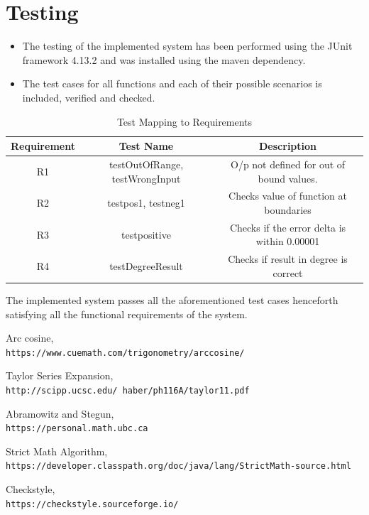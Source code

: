 \documentclass[a4paper,12pt]{article}
\begin{document}
\pagebreak

\section{Testing}
    \begin{itemize}
        \item {The testing of the implemented system has been performed using the JUnit framework 4.13.2 and was installed using the maven dependency.}
        \item{The test cases for all functions and each of their possible scenarios is included, verified and checked.}
    \end{itemize}

    \begin{table}[h]
    \centering
    \begin{tabular}{|c |c| c|} 
    \hline
     Requirement & Test Name & Description \\ [0.5ex] 
    \hline
    R1 & testOutOfRange, testWrongInput & O/p not defined for out of bound values.\\
    R2 & testpos1, testneg1 & Checks value of function at boundaries\\
    R3 & testpositive & Checks if the error delta is within 0.00001\\
    R4 & testDegreeResult & Checks if result in degree is correct\\
    \hline
    \end{tabular}
    \caption{Test Mapping to Requirements}
    \end{table}
    The implemented system passes all the aforementioned test cases henceforth satisfying all the functional requirements of the system.

\begin{thebibliography}{9}

    Arc cosine, 
    \\\texttt{https://www.cuemath.com/trigonometry/arccosine/}
    
    Taylor Series Expansion,
    \\\texttt{http://scipp.ucsc.edu/~haber/ph116A/taylor11.pdf}
    
    Abramowitz and Stegun,
    \\\texttt{https://personal.math.ubc.ca}
    
    Strict Math Algorithm,
    \\\texttt{https://developer.classpath.org/doc/java/lang/StrictMath-source.html}
    
    Checkstyle,
    \\\texttt{https://checkstyle.sourceforge.io/}

\end{thebibliography}
\end{document}

